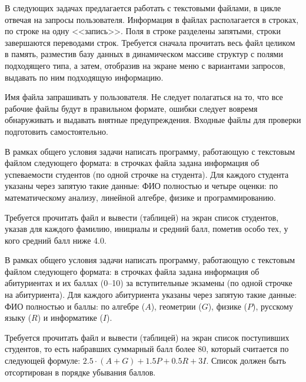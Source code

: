 
В следующих задачах предлагается работать с текстовыми файлами, в цикле
отвечая на запросы пользователя. Информация в файлах располагается в строках,
по строке на одну <<запись>>. Поля в строке разделены запятыми, строки
завершаются переводами строк. Требуется сначала прочитать весь файл целиком в
память, разместив базу данных в динамическом массиве структур с полями
подходящего типа, а затем, отобразив на экране меню с вариантами запросов,
выдавать по ним подходящую информацию.

Имя файла запрашивать у пользователя. Не следует полагаться на то, что все
рабочие файлы будут в правильном формате, ошибки следует вовремя обнаруживать
и выдавать внятные предупреждения. Входные файлы для проверки подготовить
самостоятельно.


\begin{zztask}
В рамках общего условия задачи написать программу, работающую с текстовым файлом
следующего формата: в строчках файла задана информация 
об успеваемости студентов (по одной строчке на студента).
Для каждого студента указаны через запятую такие данные: ФИО полностью и четыре оценки:
по математическому анализу, линейной алгебре, физике и программированию.

Требуется прочитать файл и вывести (таблицей) на экран список студентов, указав для 
каждого фамилию, инициалы и средний балл, пометив особо тех, у кого средний балл ниже 4.0.
\end{zztask}


\begin{zztask}
В рамках общего условия задачи написать программу, работающую с текстовым файлом
следующего формата: в строчках файла задана информация 
об абитуриентах и их баллах (0--10) за вступительные экзамены (по одной строчке на абитуриента).
Для каждого абитуриента указаны через запятую такие данные: ФИО полностью и баллы:
по алгебре ($A$), геометрии ($G$), физике ($P$), русскому языку ($R$) и информатике ($I$).

Требуется прочитать файл и вывести (таблицей) на экран список поступивших студентов, то есть 
набравших суммарный балл более 80, который считается по следующей формуле:
$2.5\cdot(A+G) + 1.5 P + 0.5 R + 3 I$. Список должен быть отсортирован в порядке убывания баллов.
\end{zztask}

